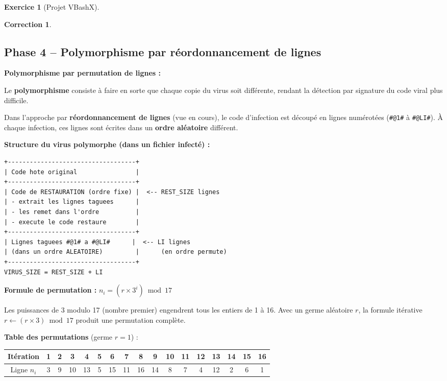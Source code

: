 \documentclass[a4paper,11pt]{article}
\theoremstyle{plain}
\newtheorem{correction}{Correction}
\theoremstyle{definition}
\newtheorem{exercice}{Exercice}
\begin{document}
\begin{exercice}[Projet VBashX]
\begin{correction}
\end{correction}



\subsection*{Phase 4 -- Polymorphisme par réordonnancement de lignes}

\begin{rappel}
\textbf{Polymorphisme par permutation de lignes :}

Le \textbf{polymorphisme} consiste à faire en sorte que chaque copie du virus soit différente, rendant la détection par signature du code viral plus difficile.

Dans l'approche par \textbf{réordonnancement de lignes} (vue en cours), le code d'infection est découpé en lignes numérotées (\texttt{\#@1\#} à \texttt{\#@LI\#}). À chaque infection, ces lignes sont écrites dans un \textbf{ordre aléatoire} différent.

\medskip
\textbf{Structure du virus polymorphe (dans un fichier infecté) :}
\begin{lstlisting}[numbers=none,frame=none,backgroundcolor=\color{white},language={}]
+-----------------------------------+
| Code hote original                |
+-----------------------------------+
| Code de RESTAURATION (ordre fixe) |  <-- REST_SIZE lignes
| - extrait les lignes taguees      |
| - les remet dans l'ordre          |
| - execute le code restaure        |
+-----------------------------------+
| Lignes taguees #@1# a #@LI#      |  <-- LI lignes
| (dans un ordre ALEATOIRE)         |      (en ordre permute)
+-----------------------------------+
VIRUS_SIZE = REST_SIZE + LI
\end{lstlisting}

\medskip
\textbf{Formule de permutation :} $n_i = (r \times 3^i) \bmod 17$

Les puissances de 3 modulo 17 (nombre premier) engendrent tous les entiers de 1 à 16. Avec un germe aléatoire $r$, la formule itérative $r \leftarrow (r \times 3) \bmod 17$ produit une permutation complète.

\medskip
\textbf{Table des permutations} (germe $r = 1$) :

\begin{center}
\begin{tabular}{c|cccccccccccccccc}
\toprule
Itération & 1 & 2 & 3 & 4 & 5 & 6 & 7 & 8 & 9 & 10 & 11 & 12 & 13 & 14 & 15 & 16 \\
\midrule
Ligne $n_i$ & 3 & 9 & 10 & 13 & 5 & 15 & 11 & 16 & 14 & 8 & 7 & 4 & 12 & 2 & 6 & 1 \\
\bottomrule
\end{tabular}
\end{center}


\end{rappel}
\end{exercice}
\end{document}
